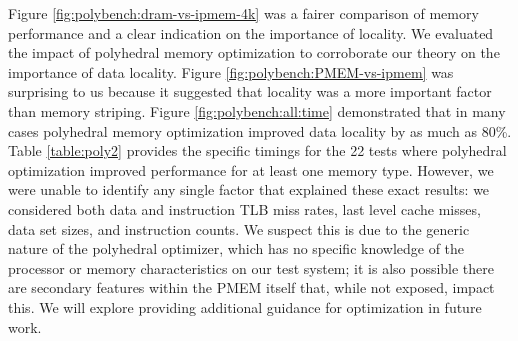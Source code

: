 Figure \ref{fig:polybench:dram-vs-ipmem-4k} was a fairer comparison of memory performance and a clear indication on the importance of locality.  We evaluated the impact of polyhedral memory optimization to corroborate our theory on the importance of data locality.  Figure \ref{fig:polybench:PMEM-vs-ipmem} was surprising to us because it suggested that locality was a more important factor than memory striping. Figure \ref{fig:polybench:all:time} demonstrated that in many cases polyhedral memory optimization improved data locality by as much as 80\%.  Table \ref{table:poly2} provides the specific timings for the 22 tests where polyhedral optimization improved performance for at least one memory type.  However, we were unable to identify any single factor that explained these exact results: we considered both data and instruction TLB miss rates, last level cache misses, data set sizes, and instruction counts. We suspect this is due to the generic nature of the polyhedral optimizer, which has no specific knowledge of the processor or memory characteristics on our test system; it is also possible there are secondary features within the PMEM itself that, while not exposed, impact this.  We will explore providing additional guidance for optimization in future work.

\begin{comment}
While prior work~\cite{yang2019empirical} combined these behaviors into a single measure (Effective Write Ration -- ``EWR'') our evaluation suggests that the performance profile is more nuanced than captured by this single ratio. Thus, we expect systems using PMEM will require workload specific evaluation across the range of configuration options to optimize performance.
\end{comment}


